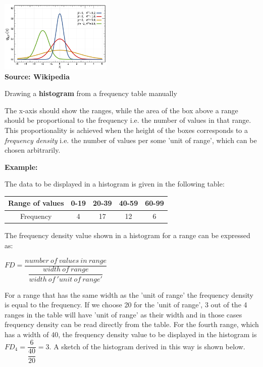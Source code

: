 \begin{itemize}
\begin{itemize}
    \includegraphics[width=0.4\textwidth]{normal_distrib_pdf.png}\\ [-1.5ex]
    {\fontsize{10}{0}\selectfont \textbf{Source: Wikipedia}}
\end{itemize}
\end{itemize}

\begin{howto}
  {Drawing a \textbf{histogram} from a frequency table manually}
  {
    The x-axis should show the ranges, while the area of the box above a range should be proportional to the frequency i.e. the number of values in that range. This proportionality is achieved when the height of the boxes corresponds to a \emph{frequency density} i.e. the number of values per some 'unit of range', which can be chosen arbitrarily. 

    \textbf{\color{darkgray} Example:}

    \begin{multicols}{2}
    The data to be displayed in a histogram is given in the following table:

    \begin{tabular}{c|c|c|c|c}
      \hline
      Range of values & 0-19 & 20-39 & 40-59 & 60-99\\
      \hline
      Frequency & 4 & 17 & 12 & 6\\
      \hline
    \end{tabular}

    The frequency density value shown in a histogram for a range can be expressed as:

    $FD = \dfrac{number\:of\:values\:in\:range}{\dfrac{width\:of\:range}{width\:of\:'unit\:of\:range'}}$

    For a range that has the same width as the 'unit of range' the frequency density is equal to the frequency. If we choose 20 for the 'unit of range', 3 out of the 4 ranges in the table will have 'unit of range' as their width and in those cases frequency density can be read directly from the table. For the fourth range, which has a width of 40, the frequency density value to be displayed in the histogram is $FD_4 = \dfrac{6}{\dfrac{40}{20}} = 3$. A sketch of the histogram derived in this way is shown below.


\end{multicols}}
\end{howto}
